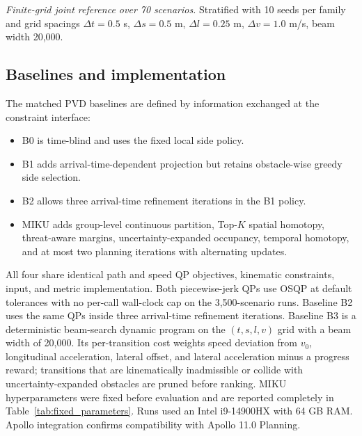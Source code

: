 \emph{Finite-grid joint reference over 70 scenarios.} Stratified with 10 seeds per family and grid spacings $\Delta t=0.5$ s, $\Delta s=0.5$ m, $\Delta l=0.25$ m, $\Delta v=1.0$ m/s, beam width 20,000.

\subsection{Baselines and implementation}
\label{sec:baselines_impl}

The matched PVD baselines are defined by information exchanged at the constraint interface:
\begin{itemize}
  \item B0 is time-blind and uses the fixed local side policy.
  \item B1 adds arrival-time-dependent projection but retains obstacle-wise greedy side selection.
  \item B2 allows three arrival-time refinement iterations in the B1 policy.
  \item MIKU adds group-level continuous partition, Top-$K$ spatial homotopy, threat-aware margins, uncertainty-expanded occupancy, temporal homotopy, and at most two planning iterations with alternating updates.
\end{itemize}
All four share identical path and speed QP objectives, kinematic constraints, input, and metric implementation. Both piecewise-jerk QPs use OSQP at default tolerances with no per-call wall-clock cap on the 3,500-scenario runs. Baseline B2 uses the same QPs inside three arrival-time refinement iterations. Baseline B3 is a deterministic beam-search dynamic program on the $(t,s,l,v)$ grid with a beam width of 20,000. Its per-transition cost weights speed deviation from $v_0$, longitudinal acceleration, lateral offset, and lateral acceleration minus a progress reward; transitions that are kinematically inadmissible or collide with uncertainty-expanded obstacles are pruned before ranking. MIKU hyperparameters were fixed before evaluation and are reported completely in Table~\ref{tab:fixed_parameters}. Runs used an Intel i9-14900HX with 64 GB RAM. Apollo integration confirms compatibility with Apollo 11.0 Planning.

